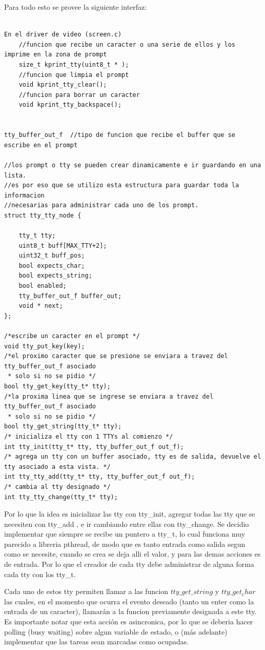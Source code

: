\documentclass[a4paper,10pt]{article}
\begin{document}
Para todo esto se provee la siguiente interfaz:

\begin{verbatim}

En el driver de video (screen.c)
    //funcion que recibe un caracter o una serie de ellos y los imprime en la zona de prompt
    size_t kprint_tty(uint8_t * );
    //funcion que limpia el prompt
    void kprint_tty_clear();
    //funcion para borrar un caracter
    void kprint_tty_backspace();


tty_buffer_out_f  //tipo de funcion que recibe el buffer que se escribe en el prompt

//los prompt o tty se pueden crear dinamicamente e ir guardando en una lista.
//es por eso que se utilizo esta estructura para guardar toda la informacion 
//necesarias para administrar cada uno de los prompt.
struct tty_tty_node {
    
    tty_t tty;
    uint8_t buff[MAX_TTY+2];
    uint32_t buff_pos;
    bool expects_char;
    bool expects_string;
    bool enabled;
    tty_buffer_out_f buffer_out;
    void * next;
};

/*escribe un caracter en el prompt */
void tty_put_key(key);
/*el proximo caracter que se presione se enviara a travez del tty_buffer_out_f asociado
 * solo si no se pidio */
bool tty_get_key(tty_t* tty);
/*la proxima linea que se ingrese se enviara a travez del tty_buffer_out_f asociado
 * solo si no se pidio */
bool tty_get_string(tty_t* tty);
/* inicializa el tty con 1 TTYs al comienzo */
int tty_init(tty_t* tty, tty_buffer_out_f out_f);
/* agrega un tty con un buffer asociado, tty es de salida, devuelve el tty asociado a esta vista. */
int tty_tty_add(tty_t* tty, tty_buffer_out_f out_f);
/* cambia al tty designado */
int tty_tty_change(tty_t* tty);
\end{verbatim}

Por lo que la idea es inicializar las tty con tty\_init, agregar todas las tty que se necesiten con tty\_add , e ir cambiando entre ellas con tty\_change. Se decidio implementar que siempre se recibe un puntero a tty\_t, lo cual funciona muy parecido a libreria pthread, de modo que es tanto entrada como salida segun como se necesite, cuando se crea se deja alli el valor, y para las demas acciones es de entrada. Por lo que el creador de cada tty debe administrar de alguna forma cada tty con los tty\_t.

Cada uno de estos tty permiten llamar a las funcion $tty\_get\_string$ y $tty\_get_char$ las cuales, en el momento que ocurra el evento deseado (tanto un enter como la entrada de un caracter), llamarán a la funcion previamente designada a este tty. Es importante notar que esta acción es asincronica, por lo que se deberia hacer polling (busy waiting) sobre algun variable de estado, o (más adelante) implementar que las tareas sean marcadas como ocupadas.
\end{document}
